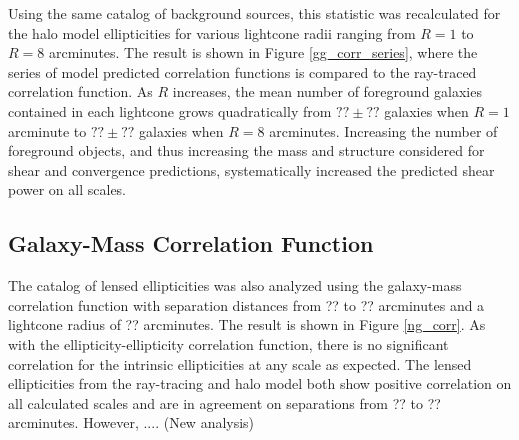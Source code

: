 \documentclass[%
 reprint,
 amsmath,amssymb,
 aps,nofootinbib
]{revtex4-1}
\begin{document}

Using the same catalog of background sources, this statistic was recalculated for the halo model ellipticities for various lightcone radii ranging from $R=1$ to $R=8$ arcminutes. The result is shown in Figure \ref{gg_corr_series}, where the series of model predicted correlation functions is compared to the ray-traced correlation function. As $R$ increases, the mean number of foreground galaxies contained in each lightcone grows quadratically from ${??\pm??}$ galaxies when $R=1$ arcminute to ${??\pm??}$ galaxies when $R=8$ arcminutes. Increasing the number of foreground objects, and thus increasing the mass and structure considered for shear and convergence predictions, systematically increased the predicted shear power on all scales. 



\subsection{Galaxy-Mass Correlation Function}

The catalog of lensed ellipticities was also analyzed using the galaxy-mass correlation function with separation distances from ?? to ?? arcminutes and a lightcone radius of ?? arcminutes. The result is shown in Figure \ref{ng_corr}. As with the ellipticity-ellipticity correlation function, there is no significant correlation for the intrinsic ellipticities at any scale as expected. The lensed ellipticities from the ray-tracing and halo model both show positive correlation on all calculated scales and are in agreement on separations from ?? to ?? arcminutes. However, .... (New analysis)

\end{document}
